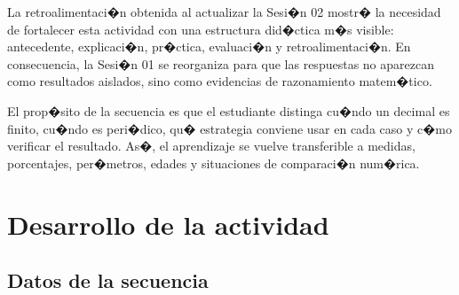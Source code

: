 \documentclass[
	spanish,
	letterpaper, oneside
]{article}
\begin{document}
La retroalimentaci�n obtenida al actualizar la Sesi�n 02 mostr� la necesidad de fortalecer esta actividad con una estructura did�ctica m�s visible: antecedente, explicaci�n, pr�ctica, evaluaci�n y retroalimentaci�n. En consecuencia, la Sesi�n 01 se reorganiza para que las respuestas no aparezcan como resultados aislados, sino como evidencias de razonamiento matem�tico.

El prop�sito de la secuencia es que el estudiante distinga cu�ndo un decimal es finito, cu�ndo es peri�dico, qu� estrategia conviene usar en cada caso y c�mo verificar el resultado. As�, el aprendizaje se vuelve transferible a medidas, porcentajes, per�metros, edades y situaciones de comparaci�n num�rica.

%
%
\section{Desarrollo de la actividad}

\subsection{Datos de la secuencia}
\end{document}
